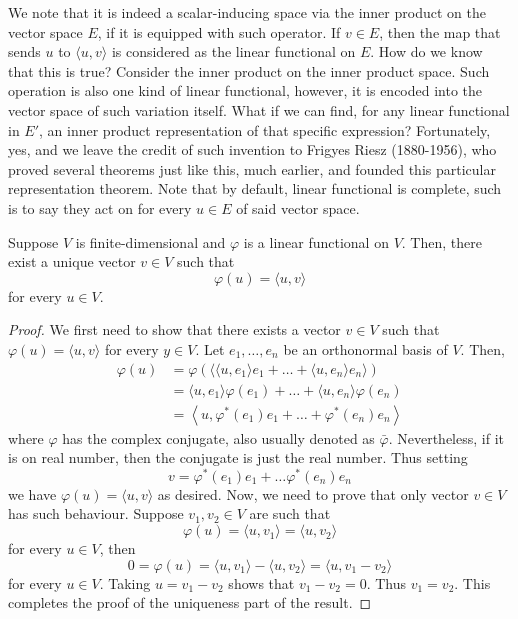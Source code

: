 We note that it is indeed a scalar-inducing space via the inner product on the vector space $E$, if it is equipped with such operator. If $v\in E$, then the map that sends $u$ to $\langle u,v\rangle$ is considered as the linear functional on $E$. How do we know that this is true? Consider the inner product on the inner product space. Such operation is also one kind of linear functional, however, it is encoded into the vector space of such variation itself. What if we can find, for any linear functional in $E'$, an inner product representation of that specific expression? Fortunately, yes, and we leave the credit of such invention to Frigyes Riesz (1880-1956), who proved several theorems just like this, much earlier, and founded this particular representation theorem. Note that by default, linear functional is complete, such is to say they act on for every $u\in E$ of said vector space. 
\begin{theorem}
    Suppose $V$ is finite-dimensional and $\varphi$ is a linear functional on $V$. Then, there exist a unique vector $v\in V$ such that 
    \begin{equation}
        \varphi(u) = \langle u,v\rangle
    \end{equation}
    for every $u\in V$. 
\end{theorem}
\begin{proof}
    We first need to show that there exists a vector $v\in V$ such that $\varphi(u)=\langle u,v\rangle$ for every $y\in V$. Let $e_{1},\dots,e_{n}$ be an orthonormal basis of $V$. Then, 
    \begin{align}
        \varphi(u) & = \varphi (\langle \langle u,e_{1} \rangle e_{1} + \dots + \langle  u,e_{n}\rangle e_{n} \rangle)\\
        & =  \langle u,e_{1} \rangle \varphi(e_{1}) + \dots + \langle  u,e_{n}\rangle \varphi(e_{n}) \\
        & = \left\langle u, \varphi^{*}(e_{1})e_{1} + \dots + \varphi^{*}(e_{n}) e_{n}\right\rangle
    \end{align}
    where $\varphi$ has the complex conjugate, also usually denoted as $\bar{\varphi}$. Nevertheless, if it is on real number, then the conjugate is just the real number. Thus setting 
    \begin{equation}
        v= \varphi^{*}(e_{1})e_{1} + \dots \varphi^{*}(e_{n})e_{n}
    \end{equation}
    we have $\varphi(u)=\langle u,v \rangle$ as desired. Now, we need to prove that only vector $v\in V$ has such behaviour. Suppose $v_{1},v_{2}\in V$ are such that 
    \begin{equation}
        \varphi(u) = \langle u,v_{1} \rangle = \langle u,v_{2} \rangle
    \end{equation}
    for every $u\in V$, then 
    \begin{equation}
        0 = \varphi(u) = \langle u,v_{1}\rangle - \langle u,v_{2} \rangle = \langle u,v_{1} - v_{2} \rangle
    \end{equation}
    for every $u\in V$. Taking $u=v_{1}-v_{2}$ shows that $v_{1}-v_{2}=0$. Thus $v_{1}=v_{2}$. This completes the proof of the uniqueness part of the result. 
\end{proof}
